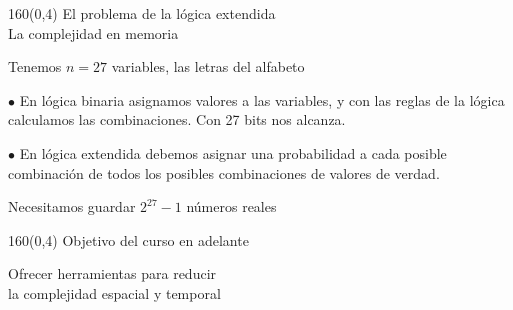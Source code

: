 \documentclass[shownotes,aspectratio=169]{beamer}
\begin{document}
\begin{frame}[plain]
\begin{textblock}{160}(0,4)
 \centering \LARGE El problema de la lógica extendida \\
 \Large La complejidad en memoria
 \end{textblock}
 \vspace{1.5cm}
 
 Tenemos $n=27$ variables, las letras del alfabeto \\
 
 \pause
 
 \vspace{0.5cm}
 
 $\bullet$ En lógica binaria asignamos valores a las variables, y con las reglas de la lógica calculamos las combinaciones. \pause Con 27 bits nos alcanza.  \\
 
 \vspace{0.5cm}
 
 \pause
 
 $\bullet$ En lógica extendida debemos asignar una probabilidad a cada posible combinación de todos los posibles combinaciones de valores de verdad.  \\
 
 \vspace{0.2cm}
  \pause
  
  Necesitamos guardar $2^{27}-1$ números reales  \\[0.2cm]
  
\end{frame}


\begin{frame}[plain]
\begin{textblock}{160}(0,4)
 \centering \LARGE Objetivo del curso en adelante
 \end{textblock}
 \vspace{1.5cm} \centering
 
\Large
 Ofrecer herramientas para reducir \\ la complejidad espacial y temporal 
 
 
\end{frame}
\end{document}
